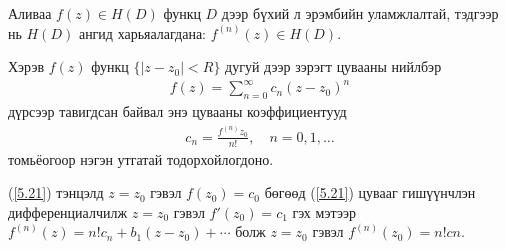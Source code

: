 \begin{thm}
Аливаа $f(z)\in H(D)$ функц $D$ дээр бүхий л эрэмбийн уламжлалтай, тэдгээр нь $H(D)$ ангид харьяалагдана: $f^{(n)} (z)\in H(D)$.
\end{thm}
\begin{thm}
Хэрэв $f(z)$ функц $\{|z-z_0|<R\}$ дугуй дээр зэрэгт цувааны нийлбэр
\begin{eqnarray} \label{5.21}
    f(z)=\sum\limits_{n=0}^\infty c_n(z-z_0)^n
\end{eqnarray}
дүрсээр тавигдсан байвал энэ цувааны коэффициентууд
\begin{eqnarray} \label{5.22}
    c_n=\frac{f^{(n)}z_0}{n!}, \quad n=0,1,\ldots
\end{eqnarray}
томьёогоор нэгэн утгатай тодорхойлогдоно.
\end{thm}
\begin{prf}
(\ref{5.21}) тэнцэлд $z=z_0$ гэвэл $f(z_0)=c_0$ бөгөөд (\ref{5.21}) цувааг гишүүнчлэн дифференциалчилж $z=z_0$ гэвэл $f'(z_0)=c_1$ гэх мэтээр $f^{(n)}(z)=n!c_n+b_1(z-z_0)+\cdots $ болж $z=z_0$ гэвэл $f^{(n)}(z_0)=n!cn.$ 
 \end{prf}

